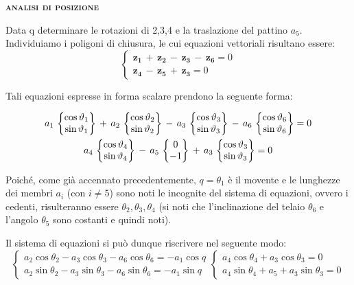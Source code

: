 		\begin{center}
			{\scshape{\bfseries analisi di posizione}}
		\end{center}
		
		Data q determinare le rotazioni di 2,3,4 e la traslazione del pattino $a_5$.
		Individuiamo i poligoni di chiusura, le cui equazioni vettoriali risultano essere:
		\[
		\begin{cases}
		\mathbf{z_1}\,+\,\mathbf{z_2}\,-\,\mathbf{z_3}\,-\,\mathbf{z_6} = 0\\
		\mathbf{z_4}\,-\,\mathbf{z_5}\,+\,\mathbf{z_3}=0
		\end{cases}
		\]
		
		Tali equazioni espresse in forma scalare prendono la seguente forma:
		
		\begin{gather}
		a_1\,\begin{Bmatrix}\cos{\vartheta_1}\\\sin{\vartheta_1}\end{Bmatrix}\,+\,a_2\,\begin{Bmatrix}\cos{\vartheta_2}\\\sin{\vartheta_2}\end{Bmatrix}\,-\,a_3\,\begin{Bmatrix}\cos{\vartheta_3}\\\sin{\vartheta_3}\end{Bmatrix}\,-\,a_6\,\begin{Bmatrix}\cos{\vartheta_6}\\\sin{\vartheta_6}\end{Bmatrix}=0\\
		a_4\,\begin{Bmatrix}\cos{\vartheta_4}\\\sin{\vartheta_4}\end{Bmatrix}\,-\,a_5\,\begin{Bmatrix}0\\-1\end{Bmatrix}\,+\,a_3\,\begin{Bmatrix}\cos{\vartheta_3}\\\sin{\vartheta_3}\end{Bmatrix}=0
		\end{gather}
		
		Poiché, come già accennato precedentemente, $q=\theta_1$ è il movente e le lunghezze dei membri $a_i$ (con $i \ne 5$) sono noti le incognite del sistema di equazioni, ovvero i cedenti, risulteranno essere $\theta_2,\theta_3,\theta_4$ (si noti che l'inclinazione del telaio $\theta_6$ e l'angolo $\theta_5$ sono costanti e quindi noti).
		
		Il sistema di equazioni si può dunque riscrivere nel seguente modo:
		\[
		\begin{cases}
		a_2 \cos{\theta_2} - a_3 \cos{\theta_3} - a_6 \cos{\theta_6} = - a_1 \cos{q}\\
		a_2 \sin{\theta_2} - a_3 \sin{\theta_3} - a_6 \sin{\theta_6} = - a_1 \sin{q}
		\end{cases}
		\begin{cases}
		a_4 \cos{\theta_4} + a_3 \cos{\theta_3} = 0\\
		a_4 \sin{\theta_4} + a_5  + a_3 \sin{\theta_3} = 0
		\end{cases}
		\]
		

